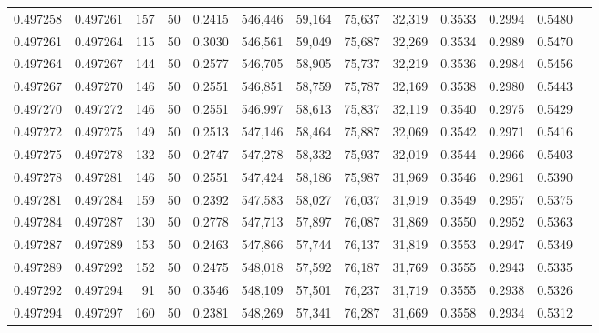 \begin{tabular}{rrrrrrrrrrrrr}
0.497258 & 0.497261 &   157 &  50 &                                     0.2415 & 546,446 &  59,164 &  75,637 &  32,319 & 0.3533 & 0.2994 & 0.5480 \\
0.497261 & 0.497264 &   115 &  50 &                                     0.3030 & 546,561 &  59,049 &  75,687 &  32,269 & 0.3534 & 0.2989 & 0.5470 \\
0.497264 & 0.497267 &   144 &  50 &                                     0.2577 & 546,705 &  58,905 &  75,737 &  32,219 & 0.3536 & 0.2984 & 0.5456 \\
0.497267 & 0.497270 &   146 &  50 &                                     0.2551 & 546,851 &  58,759 &  75,787 &  32,169 & 0.3538 & 0.2980 & 0.5443 \\
0.497270 & 0.497272 &   146 &  50 &                                     0.2551 & 546,997 &  58,613 &  75,837 &  32,119 & 0.3540 & 0.2975 & 0.5429 \\
0.497272 & 0.497275 &   149 &  50 &                                     0.2513 & 547,146 &  58,464 &  75,887 &  32,069 & 0.3542 & 0.2971 & 0.5416 \\
0.497275 & 0.497278 &   132 &  50 &                                     0.2747 & 547,278 &  58,332 &  75,937 &  32,019 & 0.3544 & 0.2966 & 0.5403 \\
0.497278 & 0.497281 &   146 &  50 &                                     0.2551 & 547,424 &  58,186 &  75,987 &  31,969 & 0.3546 & 0.2961 & 0.5390 \\
0.497281 & 0.497284 &   159 &  50 &                                     0.2392 & 547,583 &  58,027 &  76,037 &  31,919 & 0.3549 & 0.2957 & 0.5375 \\
0.497284 & 0.497287 &   130 &  50 &                                     0.2778 & 547,713 &  57,897 &  76,087 &  31,869 & 0.3550 & 0.2952 & 0.5363 \\
0.497287 & 0.497289 &   153 &  50 &                                     0.2463 & 547,866 &  57,744 &  76,137 &  31,819 & 0.3553 & 0.2947 & 0.5349 \\
0.497289 & 0.497292 &   152 &  50 &                                     0.2475 & 548,018 &  57,592 &  76,187 &  31,769 & 0.3555 & 0.2943 & 0.5335 \\
0.497292 & 0.497294 &    91 &  50 &                                     0.3546 & 548,109 &  57,501 &  76,237 &  31,719 & 0.3555 & 0.2938 & 0.5326 \\
0.497294 & 0.497297 &   160 &  50 &                                     0.2381 & 548,269 &  57,341 &  76,287 &  31,669 & 0.3558 & 0.2934 & 0.5312 \\

\end{tabular}
